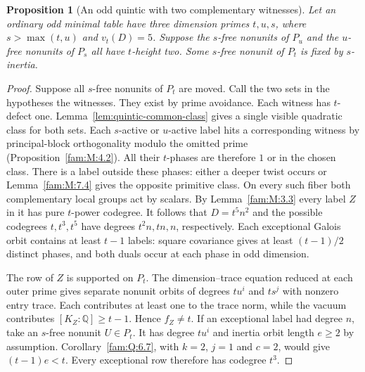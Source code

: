 \documentclass[11pt,a4paper]{article}
\numberwithin{equation}{section}
\newtheorem{proposition}[theorem]{Proposition}
\theoremstyle{remark}
\newcommand{\QQ}{\mathbb Q}
\begin{document}
\begin{proposition}[An odd quintic with two complementary witnesses]\label{fam:Q:5.3}
\label{fam:Q:n:q13:common}
Let an ordinary odd minimal table have three dimension primes
$t,u,s$, where $s>\max(t,u)$ and $v_t(D)=5$. Suppose the
$s$-free nonunits of $P_u$ and the $u$-free nonunits of $P_s$
all have $t$-height two. Some $s$-free nonunit of $P_t$ is fixed
by $s$-inertia.
\end{proposition}
\begin{proof}
Suppose all $s$-free nonunits of $P_t$ are moved. Call the two
sets in the hypotheses the witnesses. They exist by prime avoidance.
Each witness has $t$-defect one. Lemma~\ref{lem:quintic-common-class}
gives a single visible quadratic class for both sets. Each $s$-active or $u$-active label hits
a corresponding witness by principal-block orthogonality modulo
the omitted prime (Proposition~\ref{fam:M:4.2}). All their
$t$-phases are therefore $1$ or in the chosen class. There is a
label outside these phases: either a deeper twist occurs or
Lemma~\ref{fam:M:7.4} gives the opposite primitive class.
On every such fiber both complementary local groups act by
scalars. By Lemma~\ref{fam:M:3.3} every label $Z$ in it has
pure $t$-power codegree. It follows that $D=t^5n^2$ and the
possible codegrees $t,t^3,t^5$ have degrees $t^2n,tn,n$,
respectively. Each exceptional Galois orbit contains at least
$t-1$ labels: square covariance gives at least $(t-1)/2$
distinct phases, and both duals occur at each phase in odd
dimension.

The row of $Z$ is supported on $P_t$. The dimension--trace
equation reduced at each outer prime gives separate nonunit
orbits of degrees $tu^i$ and $ts^j$ with nonzero entry trace.
Each contributes at least one to the trace norm, while the vacuum
contributes $[K_Z:\QQ]\ge t-1$. Hence $f_Z\ne t$.
If an exceptional label had degree $n$, take an $s$-free nonunit
$U\in P_t$. It has degree $tu^i$ and inertia orbit length $e\ge2$
by assumption. Corollary~\ref{fam:Q:6.7}, with $k=2$, $j=1$ and
$c=2$, would give $(t-1)e<t$. Every exceptional row therefore has
codegree $t^3$.


\end{proof}
\end{document}

